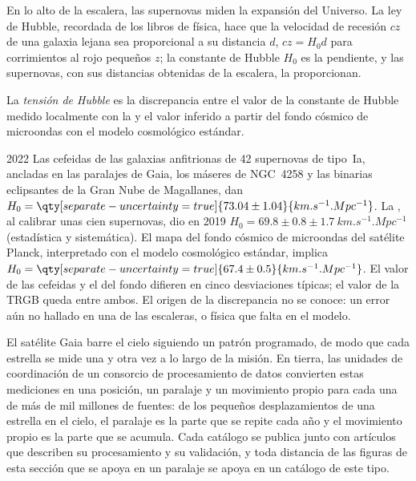 
En lo alto de la escalera, las supernovas miden la expansión del
Universo. La ley de Hubble, recordada de los libros de física, hace que la
velocidad de recesión $cz$ de una galaxia lejana sea proporcional a su distancia $d$,
$cz = H_0 d$ para corrimientos al rojo pequeños $z$; la constante de Hubble $H_0$ es la
pendiente, y las supernovas, con sus distancias obtenidas de la escalera, la proporcionan.

\begin{definition}\label{def:b3:milky-way-galaxies:tension}
La \emph{tensión de Hubble} es la discrepancia
entre el valor de la constante de Hubble medido localmente con la
 y el valor inferido a partir del fondo cósmico de
microondas con el modelo cosmológico estándar.
\end{definition}

\begin{dated}{2022}
Las cefeidas de las galaxias anfitrionas de 42 supernovas de tipo~Ia, ancladas en
las paralajes de Gaia, los máseres de NGC~4258 y las binarias eclipsantes de la
Gran Nube de Magallanes, dan
$H_0 = \qty[separate-uncertainty=true]{73.04 \pm 1.04}{km.s^{-1}.Mpc^{-1}}$.
La , al calibrar unas cien supernovas,
dio en 2019 $H_0 = 69.8 \pm 0.8 \pm \qty{1.7}{km.s^{-1}.Mpc^{-1}}$
(estadística y sistemática). El mapa del fondo cósmico de
microondas del satélite Planck, interpretado con el modelo cosmológico estándar, implica
$H_0 = \qty[separate-uncertainty=true]{67.4 \pm 0.5}{km.s^{-1}.Mpc^{-1}}$.
El valor de las cefeidas y el del fondo difieren en cinco desviaciones
típicas; el valor de la TRGB queda entre ambos. El origen de la
discrepancia no se conoce: un error aún no hallado en una de las escaleras,
o física que falta en el modelo.
\end{dated}

\begin{inthelab}
El satélite Gaia barre el cielo siguiendo un patrón programado, de modo que cada
estrella se mide una y otra vez a lo largo de la misión. En tierra, las
unidades de coordinación de un consorcio de procesamiento de datos convierten estas
mediciones en una posición, un paralaje y un movimiento propio para cada una de
más de mil millones de fuentes: de los pequeños desplazamientos de una estrella en el cielo,
el paralaje es la parte que se repite cada año y el movimiento propio
es la parte que se acumula. Cada catálogo se publica junto con artículos que
describen su procesamiento y su validación, y toda distancia de las
figuras de esta sección que se apoya en un paralaje se apoya en un
catálogo de este tipo.
\end{inthelab}

